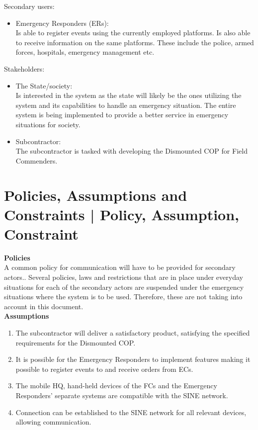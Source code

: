\noindent Secondary users:
\begin{itemize}
	\item Emergency Responders (ERs):\\
	Is able to register events using the currently employed platforms. Is also able to receive information on the same platforms. These include the police, armed forces, hospitals, emergency management etc.
\end{itemize}

\noindent Stakeholders:
\begin{itemize}
	\item The State/society: \\
	Is interested in the system as the state will likely be the ones utilizing the system and its capabilities to handle an emergency situation. The entire system is being implemented to provide a better service in emergency situations for society.
	\item Subcontractor:\\
	The subcontractor is tasked with developing the Dismounted COP for Field Commenders.
\end{itemize}


\section{Policies, Assumptions and Constraints | Policy, Assumption, Constraint}
\textbf{Policies} \\
A common policy for communication will have to be provided for secondary actors.. 
Several policies, laws and restrictions that are in place under everyday situations for each of the secondary actors are suspended under the emergency situations where the system is to be used. Therefore, these are not taking into account in this document.\\

\noindent \textbf{Assumptions}
\begin{enumerate}
	\itemsep0em
	\item The subcontractor will deliver a satisfactory product, satisfying the specified requirements for the Dismounted COP.
	\item It is possible for the Emergency Responders to implement features making it possible to register events to and receive orders from ECs.
	\item The mobile HQ, hand-held devices of the FCs and the Emergency Responders’ separate systems are compatible with the SINE network.
	\item Connection can be established to the SINE network for all relevant devices, allowing communication.
\end{enumerate}

